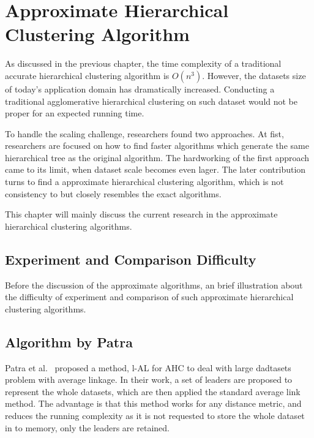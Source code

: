 \documentclass[utf8,english]{gradu3}
\begin{document}
\chapter{Approximate Hierarchical Clustering Algorithm}


As discussed in the previous chapter, the time complexity of a traditional accurate hierarchical clustering algorithm is $O(n^3)$. However, the datasets size of today's application domain has dramatically increased. Conducting a traditional agglomerative hierarchical clustering on such dataset would not be proper for an expected running time.

To handle the scaling challenge, researchers found two approaches. At fist, researchers are focused on how to find faster algorithms which generate the same hierarchical tree as the original algorithm. The hardworking of the first approach came to its limit, when dataset scale becomes even lager. The later contribution turns to find a approximate hierarchical clustering algorithm, which is not consistency to but closely resembles the exact algorithms. 

This chapter will mainly discuss the current research in the approximate hierarchical clustering algorithms. 

\section{Experiment and Comparison Difficulty}

Before the discussion of the approximate algorithms, an brief illustration about the difficulty of experiment and comparison of such approximate hierarchical clustering algorithms.


\section{Algorithm by Patra}

Patra et al.~\cite{patra2010distance}  proposed a method, l-AL for AHC to deal with large dadtasets problem with average linkage. In their work, a set of leaders are proposed to represent the whole datasets, which are then applied the standard average link method. The advantage is that this method works for any distance metric, and reduces the running complexity as it is not requested to store the whole  dataset in to memory, only the leaders are retained. 
\end{document}
